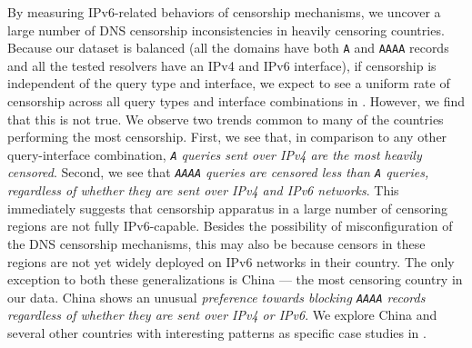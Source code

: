 By measuring IPv6-related behaviors of censorship mechanisms, we uncover
a large number of DNS censorship inconsistencies in heavily censoring
countries.
%
Because our dataset is balanced (\ie all the domains have both {\tt A} and
{\tt AAAA} records and all the tested resolvers have an IPv4 and IPv6
interface), if censorship is independent of the query type and interface, we
expect to see a uniform rate of censorship across all query types and interface
combinations in . 
%
However, we find that this is not true. We observe two trends common to many of
the countries performing the most censorship. 
%
First, we see that, in comparison to any other query-interface combination,
{\em {\tt A} queries sent over IPv4 are the most heavily censored}. Second, we
see that {\em{\tt AAAA} queries are censored less than {\tt A} queries,
regardless of whether they are sent over IPv4 and IPv6 networks}.
%
This immediately suggests that censorship apparatus in a large number of
censoring regions are not fully IPv6-capable. Besides the possibility of
misconfiguration of the DNS censorship mechanisms, this may also be because
censors in these regions are not yet widely deployed on IPv6 networks in their
country.
%
The only exception to both these generalizations is China --- the most
censoring country in our data. China shows an unusual {\em preference towards
blocking {\tt AAAA} records regardless of whether they are sent over IPv4 or
IPv6}. We explore China and several other countries with
interesting patterns as specific case studies in .

